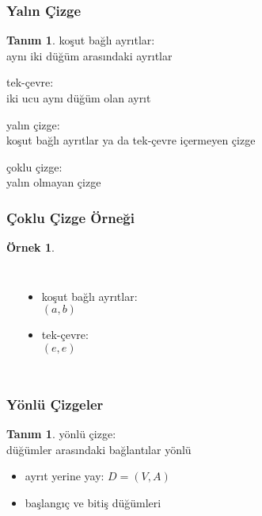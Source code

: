 \documentclass[dvipsnames]{beamer}
\theoremstyle{definition}
\newtheorem{tanim}[theorem]{Tanım}
\theoremstyle{example}
\newtheorem{ornek}[theorem]{Örnek}
\theoremstyle{plain}
\begin{document}
\begin{frame}
  \frametitle{Yalın Çizge}

  \begin{tanim}
    \alert{koşut bağlı ayrıtlar}:\\
    aynı iki düğüm arasındaki ayrıtlar

    \pause
    \bigskip
    \alert{tek-çevre}:\\
    iki ucu aynı düğüm olan ayrıt

    \pause
    \bigskip
    \alert{yalın çizge}:\\
    koşut bağlı ayrıtlar ya da tek-çevre içermeyen çizge

    \pause
    \bigskip
    \alert{çoklu çizge}:\\
    yalın olmayan çizge
  \end{tanim}
\end{frame}

\begin{frame}
  \frametitle{Çoklu Çizge Örneği}

  \begin{ornek}
    \begin{columns}
      \begin{center}
      \end{center}

      \begin{itemize}
        \item koşut bağlı ayrıtlar:\\
          $(a,b)$
        \item tek-çevre:\\
          $(e,e)$
      \end{itemize}
    \end{columns}
  \end{ornek}
\end{frame}

\begin{frame}
  \frametitle{Yönlü Çizgeler}

  \begin{tanim}
    \alert{yönlü çizge}:\\
    düğümler arasındaki bağlantılar yönlü

    \pause
    \begin{itemize}
      \item ayrıt yerine \alert{yay}: $D=(V,A)$
      \item \alert{başlangıç} ve \alert{bitiş} düğümleri
    \end{itemize}
  \end{tanim}
\end{frame}
\end{document}
